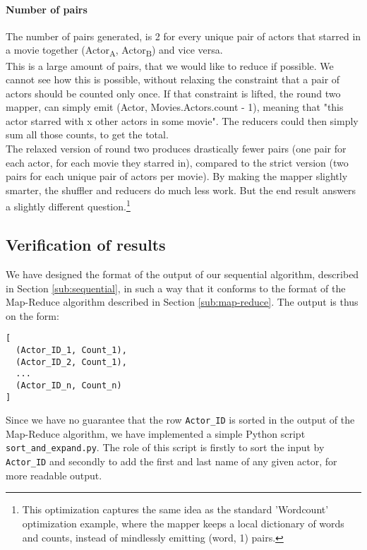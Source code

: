 \documentclass[a4paper,11pt]{article}
\begin{document}
\paragraph{Number of pairs}
The number of pairs generated, is 2 for every unique pair of actors that starred in a movie together (Actor\textsubscript{A}, Actor\textsubscript{B}) and vice versa.\\

This is a large amount of pairs, that we would like to reduce if possible. We cannot see how this is possible, without relaxing the constraint that a pair of actors should be counted only once. If that constraint is lifted, the round two mapper, can simply emit (Actor, Movies.Actors.count - 1), meaning that "this actor starred with x other actors in some movie". The reducers could then simply sum all those counts, to get the total.\\
The relaxed version of round two produces drastically fewer pairs (one pair for each actor, for each movie they starred in), compared to the strict version (two pairs for each unique pair of actors per movie). By making the mapper slightly smarter, the shuffler and reducers do much less work. But the end result answers a slightly different question.\footnote{This optimization captures the same idea as the standard 'Wordcount' optimization example, where the mapper keeps a local dictionary of words and counts, instead of mindlessly emitting (word, 1) pairs.}

\subsection{Verification of results}
We have designed the format of the output of our sequential algorithm, described in Section \ref{sub:sequential}, in such a way that it conforms to the format of the Map-Reduce algorithm described in Section \ref{sub:map-reduce}. 
The output is thus on the form:
\begin{verbatim}
[ 
  (Actor_ID_1, Count_1),
  (Actor_ID_2, Count_1),
  ...
  (Actor_ID_n, Count_n)
]
\end{verbatim}
Since we have no guarantee that the row \texttt{Actor\_ID} is sorted in the output of the Map-Reduce algorithm, we have implemented a simple Python script \texttt{sort\_and\_expand.py}. 
The role of this script is firstly to sort the input by \texttt{Actor\_ID} and secondly to add the first and last name of any given actor, for more readable output.
\end{document}
